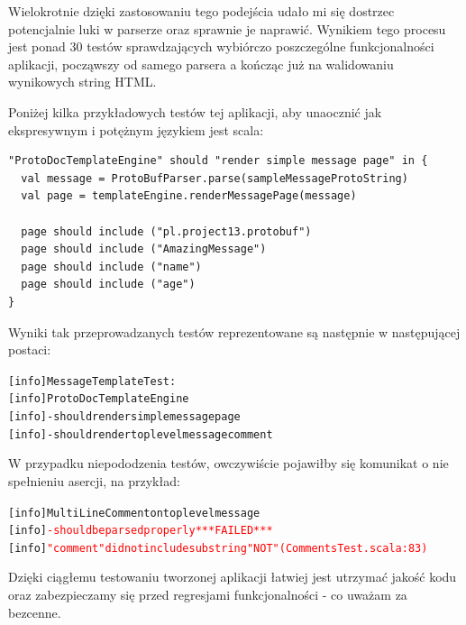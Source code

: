\documentclass[a4paper]{article}
\begin{document}
Wielokrotnie dzięki zastosowaniu tego podejścia udało mi się dostrzec potencjalnie luki w parserze oraz sprawnie je naprawić.
Wynikiem tego procesu jest ponad 30 testów sprawdzających wybiórczo poszczególne funkcjonalności aplikacji, począwszy od samego parsera 
a kończąc już na walidowaniu wynikowych string HTML.

Poniżej kilka przykładowych testów tej aplikacji, aby unaocznić jak ekspresywnym i potężnym językiem jest scala:

\begin{verbatim} 
"ProtoDocTemplateEngine" should "render simple message page" in {
  val message = ProtoBufParser.parse(sampleMessageProtoString)
  val page = templateEngine.renderMessagePage(message)

  page should include ("pl.project13.protobuf")
  page should include ("AmazingMessage")
  page should include ("name")
  page should include ("age")
}
\end{verbatim}

Wyniki tak przeprowadzanych testów reprezentowane są następnie w następującej postaci:

\begin{alltt}
[info] \textcolor{NavyBlue}{MessageTemplateTest}:
[info] \textcolor{OliveGreen}{ProtoDocTemplateEngine}
[info] \textcolor{OliveGreen}{- should render simple message page}
[info] \textcolor{OliveGreen}{- should render top level message comment}
\end{alltt}
W przypadku niepododzenia testów, owczywiście pojawiłby się komunikat o nie spełnieniu asercji, na przykład:

\begin{alltt}
[info] \textcolor{OliveGreen}{Multi Line Comment on top level message }
[info] \textcolor{Red}{- should be parsed properly *** FAILED ***}
[info] \textcolor{Red}{  "comment" did not include substring "NOT" (CommentsTest.scala:83)}
\end{alltt}

Dzięki ciągłemu testowaniu tworzonej aplikacji łatwiej jest utrzymać jakość kodu oraz zabezpieczamy się 
przed regresjami funkcjonalności - co uważam za bezcenne.


\newpage
\end{document}
